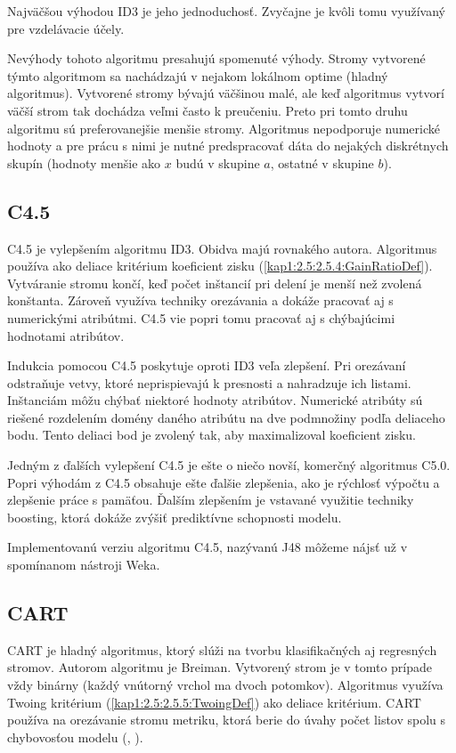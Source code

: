 Najväčšou výhodou ID3 je jeho jednoduchosť. Zvyčajne je kvôli tomu využívaný pre vzdelávacie účely. 

Nevýhody tohoto algoritmu presahujú spomenuté výhody. Stromy vytvorené týmto algoritmom sa nachádzajú v nejakom lokálnom optime (hladný algoritmus).
Vytvorené stromy bývajú väčšinou malé, ale keď algoritmus vytvorí väčší strom tak dochádza veľmi často k preučeniu. Preto pri tomto druhu algoritmu sú preferovanejšie menšie stromy. Algoritmus nepodporuje numerické hodnoty a pre prácu s nimi je nutné predspracovať dáta do nejakých diskrétnych skupín (hodnoty menšie ako $x$ budú v skupine $a$, ostatné v skupine $b$).
\subsection{C4.5}\label{kap1:2.7:2.7.4:C4.5}
C4.5 je vylepšením algoritmu ID3. Obidva majú rovnakého autora. Algoritmus používa ako deliace kritérium koeficient zisku (\ref{kap1:2.5:2.5.4:GainRatioDef}). Vytváranie stromu končí, keď počet inštancií pri delení je menší než zvolená konštanta. Zároveň využíva techniky orezávania a dokáže pracovať aj s numerickými atribútmi. C4.5 vie popri tomu  pracovať aj s chýbajúcimi hodnotami atribútov.

Indukcia pomocou C4.5 poskytuje oproti ID3 veľa zlepšení. Pri orezávaní odstraňuje vetvy, ktoré neprispievajú k presnosti a nahradzuje ich listami. Inštanciám môžu chýbať niektoré hodnoty atribútov. Numerické atribúty sú riešené rozdelením domény daného atribútu na dve podmnožiny podľa deliaceho bodu. Tento deliaci bod je zvolený tak, aby maximalizoval koeficient zisku.

Jedným z ďalších vylepšení C4.5 je ešte o niečo novší, komerčný algoritmus C5.0. Popri výhodám z C4.5 obsahuje ešte ďalšie zlepšenia, ako je rýchlosť výpočtu a zlepšenie práce s pamäťou. Ďalším zlepšením je vstavané využitie techniky boosting, ktorá dokáže zvýšiť prediktívne schopnosti modelu.

Implementovanú verziu algoritmu C4.5, nazývanú J48 môžeme nájsť už v spomínanom nástroji Weka.

\subsection{CART}\label{kap1:2.7:2.7.5:CART}
CART je hladný algoritmus, ktorý slúži na tvorbu klasifikačných aj regresných stromov. Autorom algoritmu je Breiman. Vytvorený strom je v tomto prípade vždy binárny (každý vnútorný vrchol ma dvoch potomkov). Algoritmus využíva Twoing kritérium (\ref{kap1:2.5:2.5.5:TwoingDef}) ako deliace kritérium. CART používa na orezávanie stromu metriku, ktorá berie do úvahy počet listov spolu s chybovosťou modelu (\cite{wiki-costcompprune}, \cite[s.382]{kap1-DecisionTree}).

